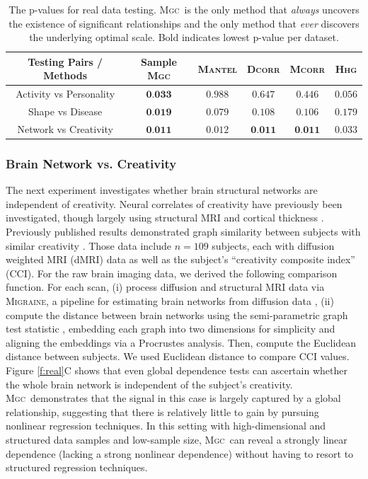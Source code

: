 \documentclass[11pt]{article}
\providecommand{\sct}[1]{{\normalfont\textsc{#1}}}
\newcommand{\Migraine}{\sct{Migraine}}
\newcommand{\Mgc}{\sct{Mgc}}
\newcommand{\Hhg}{\sct{Hhg}}
\newcommand{\Dcorr}{\sct{Dcorr}}
\newcommand{\Mcorr}{\sct{Mcorr}}
\newcommand{\Mantel}{\sct{Mantel}}
\begin{document}
\begin{table}[htbp]
\centering
\caption{The p-values for real data testing. \Mgc~is the only method that \emph{always} uncovers the existence of significant relationships and the only method that \emph{ever} discovers the underlying optimal scale. Bold indicates lowest p-value per dataset.}
\label{t:real}%
\begin{tabular}{|c||c|c|c|c|c|}
\hline
Testing Pairs / Methods & Sample \Mgc & \Mantel & \Dcorr & \Mcorr & \Hhg \\
\hline
Activity vs Personality & $\textbf{0.033}$  & $0.988$ & $0.647$ & $0.446$ & $0.056$ \\
\hline
Shape vs Disease & $\textbf{0.019}$  & $0.079$ & $0.108$ & $0.106$ & $0.179$ \\
\hline
Network vs Creativity & $\textbf{0.011}$  & ${0.012}$ & $\textbf{0.011}$ & $\textbf{0.011}$ & ${0.033}$ \\
\hline
\end{tabular}
\end{table}

\subsubsection*{Brain Network vs. Creativity}

The next experiment investigates whether brain structural networks are independent of creativity.  Neural correlates of creativity have previously been investigated, though largely using structural MRI and cortical thickness \cite{Jung2009}.  Previously published results demonstrated graph similarity between subjects with similar creativity \cite{Koutra15a}. Those data include  $n=109$ subjects, each with diffusion weighted MRI (dMRI) data as well as the subject's ``creativity composite index'' (CCI).  
For the raw brain imaging data, we derived the following comparison function.  For each scan, (i) process diffusion and structural MRI data via  \Migraine, a pipeline for estimating brain networks from diffusion data \cite{GrayRoncal2013}, (ii) 
compute the distance between brain networks using the semi-parametric graph test statistic \cite{Sussman2013,ShenVogelsteinPriebe2016,Tang2016}, embedding each graph into two dimensions for simplicity and aligning the embeddings via a Procrustes analysis.  Then, compute the Euclidean distance between subjects. We used Euclidean distance to compare CCI values. 
% 
Figure \ref{f:real}{\color{magenta}C} shows that even global dependence tests can ascertain whether the whole brain network is independent of the subject's creativity.  \Mgc~demonstrates that the signal in this case is largely captured by a global relationship, suggesting that there is relatively little to gain by pursuing nonlinear regression techniques. In this setting with high-dimensional and structured data samples and low-sample size, \Mgc~can reveal a strongly linear dependence (lacking a strong nonlinear dependence) without having to resort to structured regression techniques.
\end{document}
